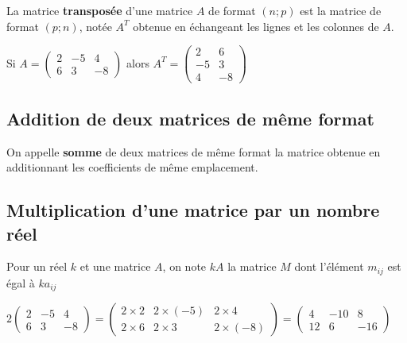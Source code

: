 \documentclass[french]{book}
\begin{document}
\begin{defn}
   
   La matrice \textbf{transposée} d'une matrice $A$ de format $(n;p)$ est la matrice de format $(p;n)$, notée $A^{T}$ obtenue en échangeant les lignes et les colonnes de $A$.
   
\end{defn}   

\begin{exemple}

Si $A=\begin{pmatrix}
    2 & -5 & 4 \\ 
   6 & 3 & -8
   \end{pmatrix} $  alors $A^{T}=\begin{pmatrix}
    2 & 6 \\ 
   -5 & 3 \\
   4 &-8
   \end{pmatrix} $ 
   
\end{exemple}
   
 \subsection{Addition de deux matrices de même format}
   
    On appelle \textbf{somme } de deux matrices de même format la matrice obtenue en additionnant les coefficients de même emplacement.
   
\subsection{Multiplication d'une matrice par un nombre réel}
   
    Pour un réel $k$ et une matrice $A$, on note $kA$ la matrice $M$ dont l'élément $m_{ij}$ est égal à $ka_{ij}$
   
\begin{exemple}
   
   $2\begin{pmatrix}
    2 & -5 & 4 \\ 
   6 & 3 & -8
   \end{pmatrix} = \begin{pmatrix}
    2\times 2 & 2\times (-5) &2\times 4 \\ 
   2\times 6 & 2\times 3 & 2 \times (-8)
   \end{pmatrix}=\begin{pmatrix}
    4 & -10 & 8 \\ 
   12 & 6 & -16
   \end{pmatrix} $ 
   
  \end{exemple}
   
\end{document}

